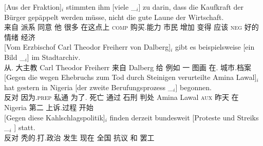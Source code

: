 \begin{sloppypar}
\ex 
\gll {}[Aus der Fraktion]$_i$ stimmten ihm [viele \_$_i$] zu darin, dass die Kaufkraft der Bürger gepäppelt werden müsse, nicht die gute Laune der Wirtschaft.\footnotemark\\
	 {}\spacebr{}来自  派系 同意 他 \spacebr{}很多 {} \prt{} 在这点上 \textsc{comp}  购买.能力  市民 增加 变得 应该 \textsc{neg}  好的 情绪  经济\\
\ex\label{bsp-von-erzbischof-bilder} 
\gll {}[Vom Erzbischof Carl Theodor Freiherr von Dalberg]$_i$ gibt es beispielsweise [ein Bild \_$_i$]
        im Stadtarchiv.\footnotemark\\
	{}\spacebr{}从. 大主教 Carl Theodor Freiherr 来自 Dalberg 给 \expl{} 例如 \spacebr{}一 图画 {} 在. 城市.档案\\
\ex 
\gll {}[Gegen die wegen Ehebruchs zum Tod durch Steinigen verurteilte Amina Lawal]$_i$ hat gestern in Nigeria
    [der zweite Berufungsprozess \_$_i$] begonnen.\footnotemark\\
	{}\spacebr{}反对  因为.\textsc{prep} 私通 为了. 死亡 通过 石刑 判处 Amina Lawal \textsc{aux} 昨天 在 Nigeria \spacebr{} 第二 上诉.过程 {} 开始\\
\ex 
\gll {}[Gegen                  diese        Kahlschlagspolitik]$_i$ finden derzeit bundesweit                     [Proteste und Streiks \_$_i$ ] statt.\footnotemark\\
     {}\spacebr{}反对  秃的.打.政治    发生   现在 \spacebr{}全国 \spacebr{}抗议 和 罢工 {} {} \prt{}\\

\end{sloppypar}
